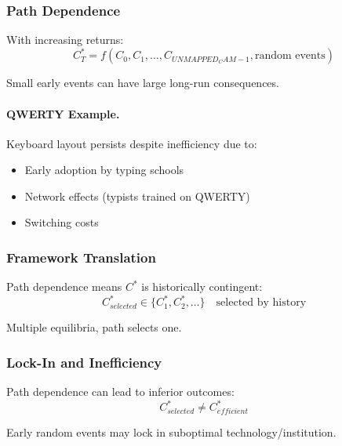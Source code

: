 \subsubsection{Path Dependence}

With increasing returns:
\begin{equation}
\boxed{
C^*_T = f(C_0, C_1, \ldots, C_{UNMAPPED_CAM-1}, \text{random events})
}
\label{eq:path-dependence}
\end{equation}

Small early events can have large long-run consequences.

\paragraph{QWERTY Example.}
Keyboard layout persists despite inefficiency due to:
\begin{itemize}
    \item Early adoption by typing schools
    \item Network effects (typists trained on QWERTY)
    \item Switching costs
\end{itemize}

\subsubsection{Framework Translation}

Path dependence means $C^*$ is historically contingent:
\begin{equation}
C^*_{selected} \in \{C^*_1, C^*_2, \ldots\} \quad \text{selected by history}
\end{equation}

Multiple equilibria, path selects one.

\subsubsection{Lock-In and Inefficiency}

Path dependence can lead to inferior outcomes:
\begin{equation}
C^*_{selected} \neq C^*_{efficient}
\end{equation}

Early random events may lock in suboptimal technology/institution.

